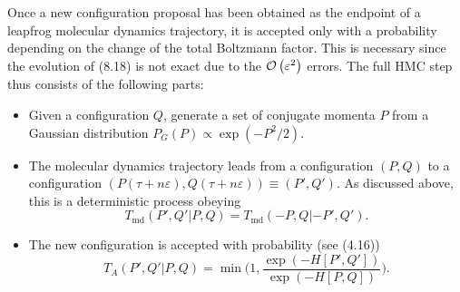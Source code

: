 Once a new configuration proposal has been obtained as the endpoint of a
leapfrog molecular dynamics trajectory, it is accepted only with a probability
depending on the change of the total Boltzmann factor. This is necessary since
the evolution of (8.18) is not exact due to the $\mathcal{O}\left(\varepsilon^2\right)$ errors.
The full HMC step thus consists of the following parts:
\begin{itemize}
  \item Given a configuration $Q$, generate a set of conjugate momenta $P$ from
        a Gaussian distribution $P_G(P) \propto \exp(-P^2/2)$.
  \item The molecular dynamics trajectory leads from a configuration $(P,Q)$ to
        a configuration $(P(\tau + n\varepsilon), Q(\tau + n\varepsilon))
        \equiv (P',Q')$. As discussed above, this is a deterministic process
        obeying
        \begin{equation}
        T_{\mathrm{md}}(P',Q'|P,Q) = T_{\mathrm{md}}(-P,Q|-P',Q').
        \end{equation}
  \item The new configuration is accepted with probability (see (4.16))
        \begin{equation}
        T_A(P',Q'|P,Q) = \min\!\Big(1, \frac{\exp(-H[P',Q'])}{\exp(-H[P,Q])}\Big).
        \end{equation}
\end{itemize}

